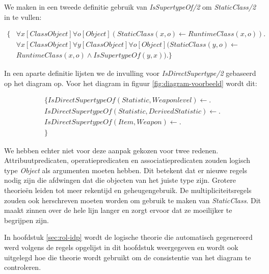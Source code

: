 We maken in een tweede definitie gebruik van \textit{IsSupertypeOf/2} om \textit{StaticClass/2} in te vullen:

\begin{align*}
\{
&\forall{x}[ClassObject]\forall{o}[Object](StaticClass(x,o) \leftarrow RuntimeClass(x,o)). \\
&\forall{x}[ClassObject]\forall{y}[ClassObject]\forall{o}[Object](StaticClass(y,o) \leftarrow \\ &RuntimeClass(x,o) \land IsSupertypeOf(y,x)).
\}
\end{align*}

In een aparte definitie lijsten we de invulling voor \textit{IsDirectSupertype/2} gebaseerd op het diagram op. Voor het diagram in figuur \ref{fig:diagram-voorbeeld} wordt dit:

\begin{align*}
\{
IsDirectSupertypeOf(Statistic,Weaponlevel) \leftarrow .\\
IsDirectSupertypeOf(Statistic,DerivedStatistic) \leftarrow .\\
IsDirectSupertypeOf(Item,Weapon) \leftarrow .\\
\}
\end{align*}

We hebben echter niet voor deze aanpak gekozen voor twee redenen.
Attribuutpredicaten, operatiepredicaten en associatiepredicaten zouden logisch type \textit{Object} als argumenten moeten hebben. Dit betekent dat er nieuwe regels nodig zijn die afdwingen dat die objecten van het juiste type zijn. Grotere theorie\"en leiden tot meer rekentijd en geheugengebruik.
De multipliciteitsregels zouden ook herschreven moeten worden om gebruik te maken van \textit{StaticClass}. Dit maakt zinnen over de hele lijn langer en zorgt ervoor dat ze moeilijker te begrijpen zijn.

\parbreak

In hoofdstuk \ref{sec:rol-idp} wordt de logische theorie die automatisch gegenereerd werd volgens de regels opgelijst in dit hoofdstuk weergegeven en wordt ook uitgelegd hoe die theorie wordt gebruikt om de consistentie van het diagram te controleren.